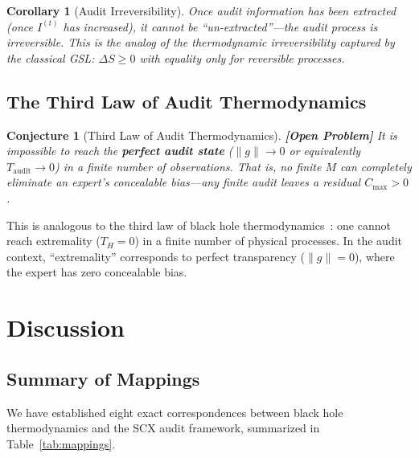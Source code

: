 \documentclass[12pt,a4paper]{article}
\newtheorem{corollary}[theorem]{Corollary}
\newtheorem{conjecture}[theorem]{Conjecture}
\theoremstyle{remark}
\newcommand{\SCX}{\textsf{SCX}}
\newcommand{\openproblem}{\textbf{[Open Problem]}}
\begin{document}
\begin{corollary}[Audit Irreversibility]
\label{cor:audit_irreversibility}
Once audit information has been extracted (once $I^{(t)}$ has increased), it cannot be ``un-extracted''---the audit process is irreversible. This is the analog of the thermodynamic irreversibility captured by the classical GSL: $\Delta S \geq 0$ with equality only for reversible processes.
\end{corollary}

\subsection{The Third Law of Audit Thermodynamics}

\begin{conjecture}[Third Law of Audit Thermodynamics]
\label{conj:third_law}
\openproblem
It is impossible to reach the \textbf{perfect audit state} ($\|g\| \to 0$ or equivalently $T_{\text{audit}} \to 0$) in a finite number of observations. That is, no finite $M$ can completely eliminate an expert's concealable bias---any finite audit leaves a residual $C_{\max} > 0$.
\end{conjecture}

This is analogous to the third law of black hole thermodynamics~\cite{israel1986third}: one cannot reach extremality ($T_H = 0$) in a finite number of physical processes. In the audit context, ``extremality'' corresponds to perfect transparency ($\|g\| = 0$), where the expert has zero concealable bias.


\section{Discussion}
\label{sec:discussion}

\subsection{Summary of Mappings}

We have established eight exact correspondences between black hole thermodynamics and the \SCX{} audit framework, summarized in Table~\ref{tab:mappings}.
\end{document}
